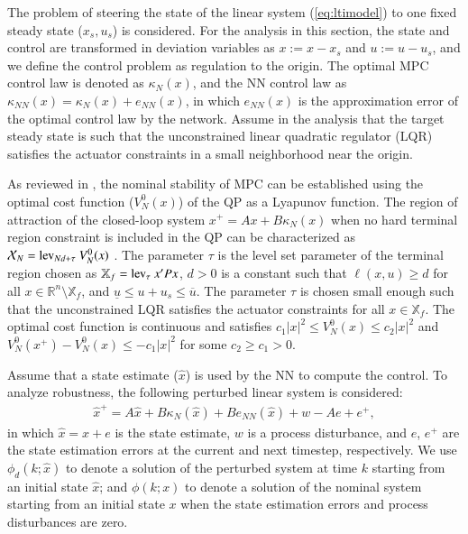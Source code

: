 \documentclass[preprint,5p, twocolumn, authoryear]{elsarticle}
\newcommand{\bbR}{\mathbb{R}}
\newcommand{\norm}[1]{\left| #1 \right|}
\newcommand{\xhat}{\hat{x}}
\newcommand{\bbX}{\mathbb{X}}
\begin{document}
The problem of steering the state of the linear system (\ref{eq:ltimodel}) to
one fixed steady state ($x_s, u_s$) is considered. For the analysis in this
section, the state and control are transformed in deviation variables as $x := x
- x_s$ and $u := u -u_s$, and we define the control problem as regulation to the
origin. The optimal MPC control law is denoted as $\kappa_N(x)$, and the NN
control law as $\kappa_{NN}(x) = \kappa_N(x) + e_{NN}(x)$, in which $e_{NN}(x)$
is the approximation error of the optimal control law by the network. Assume in
the analysis that the target steady state is such that the unconstrained linear
quadratic regulator (LQR) satisfies the actuator constraints in a small
neighborhood near the origin. 

As reviewed in \cite{mayne:rawlings:rao:scokaert:2000}, the nominal stability of
MPC can be established using the optimal cost function ($V_N^0(x)$) of the QP as
a Lyapunov function. The region of attraction of the closed-loop system $x^+ =
Ax + B\kappa_N(x)$ when no hard terminal region constraint is included in the QP
can be characterized as $\mathcal{X}_N = \textnormal{lev}_{Nd + \tau} \
V_N^0(x)$ \citep{limon:alamo:salas:camacho:2006}. The parameter $\tau$ is the
level set parameter of the terminal region chosen as $\bbX_f =
\textnormal{lev}_{\tau} \ x'Px$, $d > 0$ is a constant such that $\ell(x, u)
\geq d$ for all $x \in \bbR^n \setminus \bbX_f$, and $\underline{u} \leq u+u_s
\leq \overline{u}$. The parameter $\tau$ is chosen small enough such that the
unconstrained LQR satisfies the actuator constraints for all $x \in \bbX_f$. The
optimal cost function is continuous and satisfies $c_1\norm{x}^2 \leq V_N^0(x)
\leq c_2\norm{x}^2$ and $V_N^0(x^+) - V_N^0(x) \leq -c_1\norm{x}^2$ for some
$c_2 \geq c_1 > 0$.

Assume that a state estimate ($\xhat$) is used by the NN to compute the control.
To analyze robustness, the following perturbed linear system is considered:
\begin{align} \label{eq:perturbed_sys}
    \xhat^+ = A\xhat + B\kappa_N(\xhat) + Be_{NN}(\xhat) + w - Ae + e^+,
\end{align}
in which $\xhat = x + e$ is the state estimate, $w$ is a process disturbance,
and $e$, $e^+$ are the state estimation errors at the current and next timestep,
respectively. We use $\phi_d(k;\xhat)$ to denote a solution of the perturbed
system  at time $k$ starting from an initial state $\xhat$; and $\phi(k;x)$ to
denote a solution  of the nominal system starting  from an initial state $x$
when the state estimation errors and process disturbances are zero.
\end{document}
